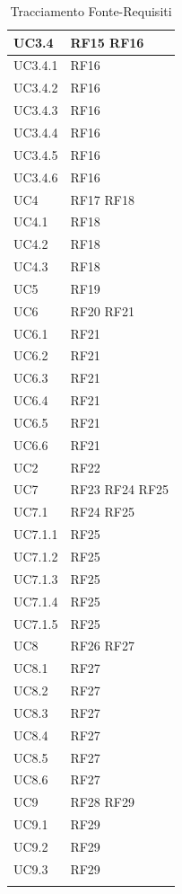 \documentclass[10pt]{article}
\begin{document}
\begin{justify}
\begin{center}
\begin{longtable}{|>{\vspace{5pt}}C{2.7cm}<{\vspace{5pt}}|>{\vspace{5pt}}C{2.7cm}<{\vspace{5pt}}|}
\hline
UC3.4 & RF15 \linebreak RF16\\
\hline
UC3.4.1 & RF16\\
\hline
UC3.4.2 & RF16\\
\hline
UC3.4.3 & RF16\\
\hline
UC3.4.4 & RF16\\
\hline
UC3.4.5 & RF16\\
\hline
UC3.4.6 & RF16\\
\hline
UC4 & RF17 \linebreak RF18\\
\hline
UC4.1 & RF18\\
\hline
UC4.2 & RF18\\
\hline
UC4.3 & RF18\\
\hline
UC5 & RF19\\
\hline
UC6 & RF20 \linebreak RF21\\
\hline
UC6.1 & RF21\\
\hline
UC6.2 & RF21\\
\hline
UC6.3 & RF21\\
\hline
UC6.4 & RF21\\
\hline
UC6.5 & RF21\\
\hline
UC6.6 & RF21\\
\hline
UC2 & RF22\\
\hline
UC7 & RF23 \linebreak RF24 \linebreak RF25\\
\hline
UC7.1 & RF24 \linebreak RF25\\
\hline
UC7.1.1 & RF25\\
\hline
UC7.1.2 & RF25\\
\hline
UC7.1.3 & RF25\\
\hline
UC7.1.4 & RF25\\
\hline
UC7.1.5 & RF25\\
\hline
UC8 & RF26 \linebreak RF27\\
\hline
UC8.1 & RF27\\
\hline
UC8.2 & RF27\\
\hline
UC8.3 & RF27\\
\hline
UC8.4 & RF27\\
\hline
UC8.5 & RF27\\
\hline
UC8.6 & RF27\\
\hline
UC9 & RF28 \linebreak RF29\\
\hline
UC9.1 & RF29\\
\hline
UC9.2 & RF29\\
\hline
UC9.3 & RF29\\
\hline
\caption{Tracciamento Fonte-Requisiti}
\end{longtable}
\end{center}


\end{justify}
\end{document}
